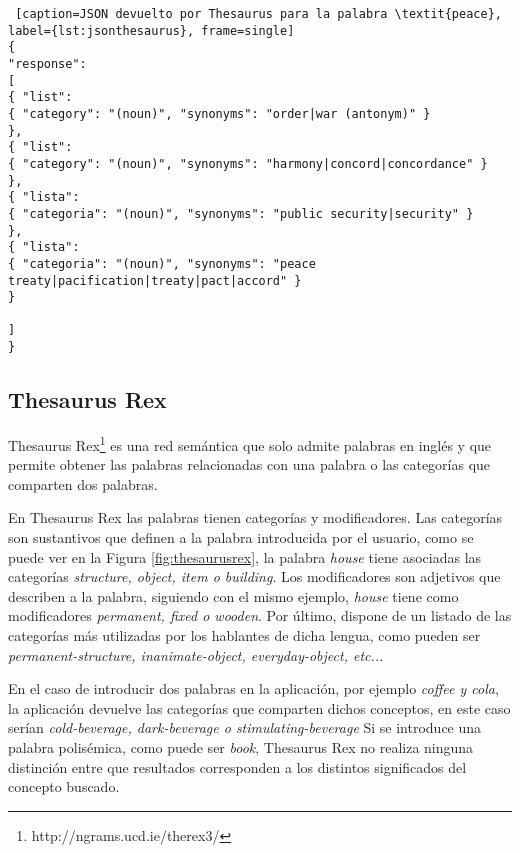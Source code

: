 
\begin{lstlisting} [caption=JSON devuelto por Thesaurus para la palabra \textit{peace}, label={lst:jsonthesaurus}, frame=single]
{
"response":
[
{ "list": 
{ "category": "(noun)", "synonyms": "order|war (antonym)" }
},
{ "list": 
{ "category": "(noun)", "synonyms": "harmony|concord|concordance" }
},
{ "lista": 
{ "categoria": "(noun)", "synonyms": "public security|security" }
},
{ "lista": 
{ "categoria": "(noun)", "synonyms": "peace treaty|pacification|treaty|pact|accord" }
}

]
}
\end{lstlisting}




\subsection{Thesaurus Rex}
\label{cap:subsec:thesaurusrex}

Thesaurus Rex\footnote{http://ngrams.ucd.ie/therex3/} es una red semántica que solo admite palabras en inglés y que permite obtener las palabras relacionadas con una palabra o las categorías que comparten dos palabras.

En Thesaurus Rex las palabras tienen categorías y modificadores. Las categorías son sustantivos que definen a la palabra introducida por el usuario, como se puede ver en la Figura \ref{fig:thesaurusrex}, la palabra \textit{house} tiene asociadas las categorías \textit{structure, object, item o building}. Los modificadores son adjetivos que describen a la palabra, siguiendo con el mismo ejemplo, \textit{house} tiene como modificadores \textit{permanent, fixed o wooden}. Por último, dispone de un listado de las categorías más utilizadas por los hablantes de dicha lengua, como pueden ser \textit{permanent-structure, inanimate-object, everyday-object, etc...} 

En el caso de introducir dos palabras en la aplicación, por ejemplo \textit{coffee y cola}, la aplicación devuelve las categorías que comparten dichos conceptos, en este caso serían \textit{cold-beverage, dark-beverage o stimulating-beverage} Si se introduce una palabra polisémica, como puede ser \textit{book}, Thesaurus Rex no realiza ninguna distinción entre que resultados corresponden a los distintos significados del concepto buscado.

